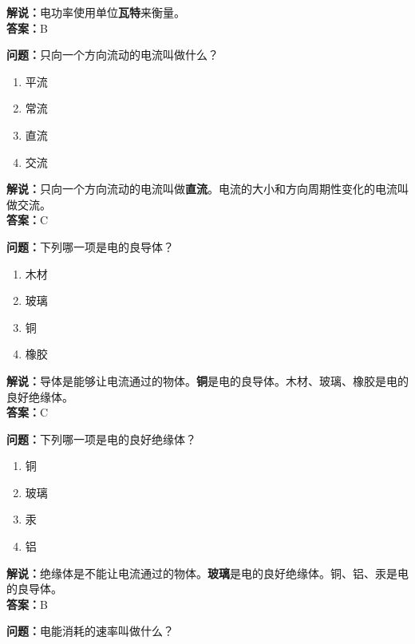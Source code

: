 \documentclass{ctexbook}
\begin{document}
\noindent\textbf{解说：}电功率使用单位\textbf{瓦特}来衡量。\\\noindent\textbf{答案：}B


\bigskip


\noindent\textbf{问题：}只向一个方向流动的电流叫做什么？

\begin{enumerate}[label=\Alph*), leftmargin=3em]
	\item 平流
	\item 常流
	\item 直流
	\item 交流
\end{enumerate}

\noindent\textbf{解说：}只向一个方向流动的电流叫做\textbf{直流}。电流的大小和方向周期性变化的电流叫做交流。\\\noindent\textbf{答案：}C

\bigskip


\noindent\textbf{问题：}下列哪一项是电的良导体？

\begin{enumerate}[label=\Alph*), leftmargin=3em]
	\item 木材
	\item 玻璃
	\item 铜
	\item 橡胶
\end{enumerate}

\noindent\textbf{解说：}导体是能够让电流通过的物体。\textbf{铜}是电的良导体。木材、玻璃、橡胶是电的良好绝缘体。\\\noindent\textbf{答案：}C


\bigskip


\noindent\textbf{问题：}下列哪一项是电的良好绝缘体？

\begin{enumerate}[label=\Alph*), leftmargin=3em]
	\item 铜
	\item 玻璃
	\item 汞
	\item 铝
\end{enumerate}

\noindent\textbf{解说：}绝缘体是不能让电流通过的物体。\textbf{玻璃}是电的良好绝缘体。铜、铝、汞是电的良导体。\\\noindent\textbf{答案：}B


\bigskip


\noindent\textbf{问题：}电能消耗的速率叫做什么？
\end{document}
